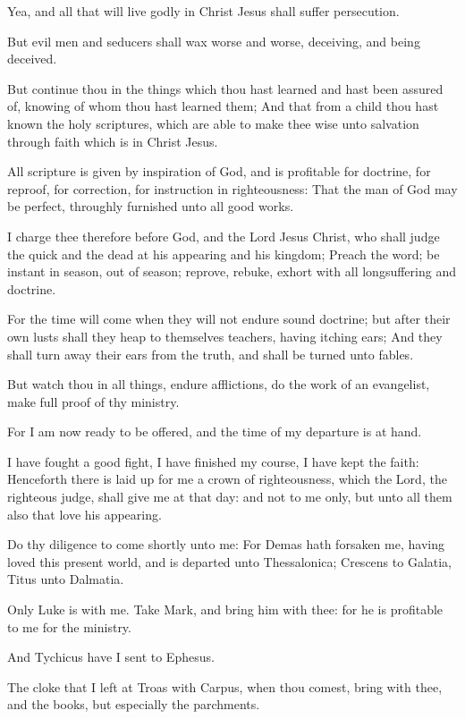 \Verse Yea, and all that will live godly in Christ Jesus shall suffer persecution.

\Verse But evil men and seducers shall wax worse and worse, deceiving, and being deceived.

\Verse But continue thou in the things which thou hast learned and hast been assured of, knowing of whom thou hast learned them; \Verse And that from a child thou hast known the holy scriptures, which are able to make thee wise unto salvation through faith which is in Christ Jesus.

\Verse All scripture is given by inspiration of God, and is profitable for doctrine, for reproof, for correction, for instruction in righteousness: \Verse That the man of God may be perfect, throughly furnished unto all good works.


\Chapter
\Verse I charge thee therefore before God, and the Lord Jesus Christ, who shall judge the quick and the dead at his appearing and his kingdom; \Verse Preach the word; be instant in season, out of season; reprove, rebuke, exhort with all longsuffering and doctrine.

\Verse For the time will come when they will not endure sound doctrine; but after their own lusts shall they heap to themselves teachers, having itching ears; \Verse And they shall turn away their ears from the truth, and shall be turned unto fables.

\Verse But watch thou in all things, endure afflictions, do the work of an evangelist, make full proof of thy ministry.

\Verse For I am now ready to be offered, and the time of my departure is at hand.

\Verse I have fought a good fight, I have finished my course, I have kept the faith: \Verse Henceforth there is laid up for me a crown of righteousness, which the Lord, the righteous judge, shall give me at that day: and not to me only, but unto all them also that love his appearing.

\Verse Do thy diligence to come shortly unto me: \Verse For Demas hath forsaken me, having loved this present world, and is departed unto Thessalonica; Crescens to Galatia, Titus unto Dalmatia.

\Verse Only Luke is with me. Take Mark, and bring him with thee: for he is profitable to me for the ministry.

\Verse And Tychicus have I sent to Ephesus.

\Verse The cloke that I left at Troas with Carpus, when thou comest, bring with thee, and the books, but especially the parchments.

